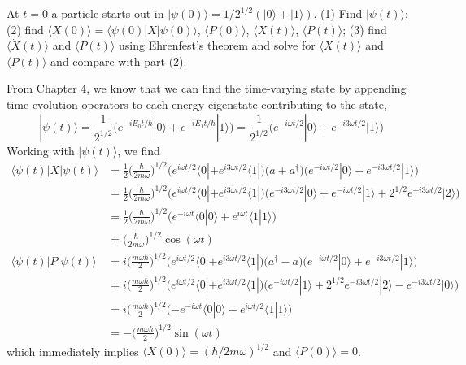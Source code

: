 \documentclass[../principles-of-quantum-mechanics.tex]{subfiles}
\begin{document}
\begin{questions}
		\question At $t = 0$ a particle starts out in $|\psi(0)\rangle = 1/2^{1/2}(|0\rangle + |1\rangle)$. (1) Find $|\psi(t)\rangle$; (2) find $\langle X(0)\rangle = \langle\psi(0)|X|\psi(0)\rangle$, $\langle P(0)\rangle$, $\langle X(t)\rangle$, $\langle P(t)\rangle$; (3) find $\langle \dot{X}(t)\rangle$ and $\langle \dot{P}(t)\rangle$ using Ehrenfest's theorem and solve for $\langle X(t)\rangle$ and $\langle P(t)\rangle$ and compare with part (2).
		\begin{solution}
			From Chapter 4, we know that we can find the time-varying state by appending time evolution operators to each energy eigenstate contributing to the state,
			$$|\psi(t)\rangle = \frac{1}{2^{1/2}}\Big(e^{-iE_0t/\hbar}|0\rangle + e^{-iE_1t/\hbar}|1\rangle\Big) = \frac{1}{2^{1/2}}\Big(e^{-i\omega t/2}|0\rangle + e^{-i3\omega t/2}|1\rangle\Big)$$
			Working with $|\psi(t)\rangle$, we find
			\begin{align*}
				\langle \psi(t)|X|\psi(t)\rangle &= \frac{1}{2}\Big(\frac{\hbar}{2m\omega}\Big)^{1/2}\Big(e^{i\omega t/2}\langle 0| + e^{i3\omega t/2}\langle 1|\Big)\Big(a + a^\dagger\Big)\Big(e^{-i\omega t/2}|0\rangle + e^{-i3\omega t/2}|1\rangle\Big) \\
				&= \frac{1}{2}\Big(\frac{\hbar}{2m\omega}\Big)^{1/2}\Big(e^{i\omega t/2}\langle 0| + e^{i3\omega t/2}\langle 1|\Big)\Big(e^{-i3\omega t/2}|0\rangle + e^{-i\omega t/2}|1\rangle + 2^{1/2}e^{-i3\omega t/2}|2\rangle\Big) \\
				&= \frac{1}{2}\Big(\frac{\hbar}{2m\omega}\Big)^{1/2}\Big(e^{-i\omega t}\langle 0|0\rangle + e^{i\omega t}\langle 1|1\rangle\Big) \\
				&= \Big(\frac{\hbar}{2m\omega}\Big)^{1/2}\cos(\omega t) \\
				\langle \psi(t)|P|\psi(t)\rangle &= i\Big(\frac{m\omega\hbar}{2}\Big)^{1/2}\Big(e^{i\omega t/2}\langle 0| + e^{i3\omega t/2}\langle 1|\Big)\Big(a^\dagger - a\Big)\Big(e^{-i\omega t/2}|0\rangle + e^{-i3\omega t/2}|1\rangle\Big) \\
				&= i\Big(\frac{m\omega\hbar}{2}\Big)^{1/2}\Big(e^{i\omega t/2}\langle 0| + e^{i3\omega t/2}\langle 1|\Big)\Big(e^{-i\omega t/2}|1\rangle + 2^{1/2}e^{-i3\omega t/2}|2\rangle - e^{-i3\omega t/2}|0\rangle \Big) \\
				&= i\Big(\frac{m\omega\hbar}{2}\Big)^{1/2}\Big({-e^{-i\omega t}}\langle 0|0\rangle + e^{i\omega t/2}\langle 1|1\rangle\Big) \\
				&= -\Big(\frac{m\omega\hbar}{2}\Big)^{1/2}\sin(\omega t)
			\end{align*}
			which immediately implies $\langle X(0)\rangle = (\hbar/2m\omega)^{1/2}$ and $\langle P(0)\rangle = 0$.
			

\end{solution}
\end{questions}
\end{document}
